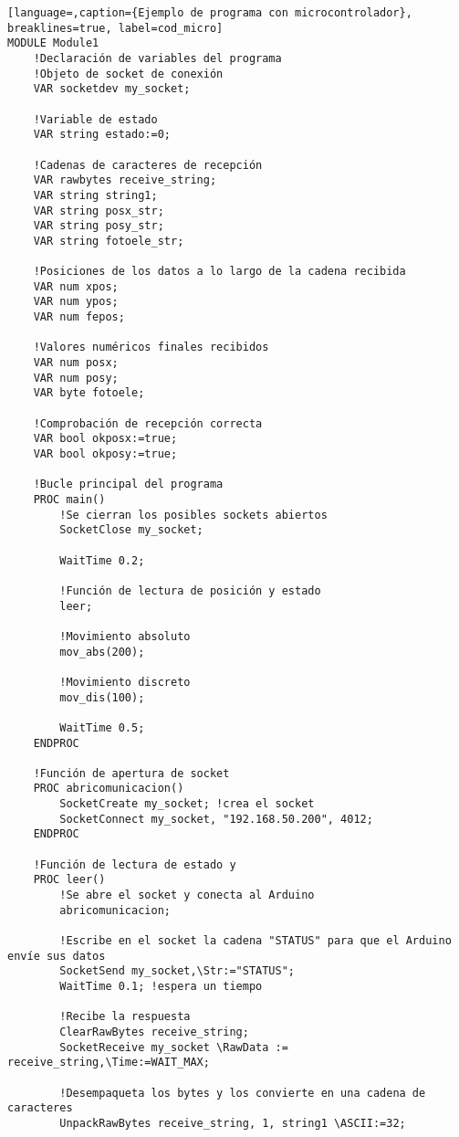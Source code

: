 \begin{lstlisting}[language=,caption={Ejemplo de programa con microcontrolador}, breaklines=true, label=cod_micro]
MODULE Module1  
    !Declaración de variables del programa
    !Objeto de socket de conexión
    VAR socketdev my_socket;

    !Variable de estado
    VAR string estado:=0;

    !Cadenas de caracteres de recepción
    VAR rawbytes receive_string;
    VAR string string1;
    VAR string posx_str;
    VAR string posy_str;
    VAR string fotoele_str;

    !Posiciones de los datos a lo largo de la cadena recibida
    VAR num xpos;
    VAR num ypos;
    VAR num fepos;
    
    !Valores numéricos finales recibidos
    VAR num posx;
    VAR num posy;
    VAR byte fotoele;
    
    !Comprobación de recepción correcta
    VAR bool okposx:=true;
    VAR bool okposy:=true;

    !Bucle principal del programa
    PROC main()
        !Se cierran los posibles sockets abiertos
        SocketClose my_socket;
        
        WaitTime 0.2;
        
        !Función de lectura de posición y estado
        leer;

        !Movimiento absoluto
        mov_abs(200);

        !Movimiento discreto
        mov_dis(100);

        WaitTime 0.5;
    ENDPROC
    
    !Función de apertura de socket
    PROC abricomunicacion()        
        SocketCreate my_socket; !crea el socket
        SocketConnect my_socket, "192.168.50.200", 4012;        
    ENDPROC
    
    !Función de lectura de estado y 
    PROC leer()
        !Se abre el socket y conecta al Arduino
        abricomunicacion;
        
        !Escribe en el socket la cadena "STATUS" para que el Arduino envíe sus datos
        SocketSend my_socket,\Str:="STATUS"; 
        WaitTime 0.1; !espera un tiempo

        !Recibe la respuesta 
        ClearRawBytes receive_string;
        SocketReceive my_socket \RawData := receive_string,\Time:=WAIT_MAX;
        
        !Desempaqueta los bytes y los convierte en una cadena de caracteres
        UnpackRawBytes receive_string, 1, string1 \ASCII:=32;
        

\end{lstlisting}
